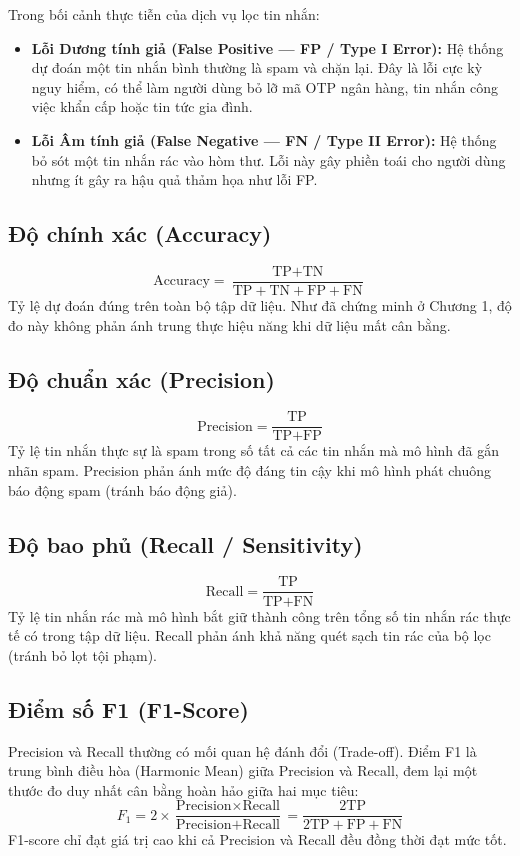 Trong bối cảnh thực tiễn của dịch vụ lọc tin nhắn:
\begin{itemize}
    \item \textbf{Lỗi Dương tính giả (False Positive --- FP / Type I Error):} Hệ thống dự đoán một tin nhắn bình thường là spam và chặn lại. Đây là lỗi cực kỳ nguy hiểm, có thể làm người dùng bỏ lỡ mã OTP ngân hàng, tin nhắn công việc khẩn cấp hoặc tin tức gia đình.
    \item \textbf{Lỗi Âm tính giả (False Negative --- FN / Type II Error):} Hệ thống bỏ sót một tin nhắn rác vào hòm thư. Lỗi này gây phiền toái cho người dùng nhưng ít gây ra hậu quả thảm họa như lỗi FP.
\end{itemize}

\subsection{Độ chính xác (Accuracy)}
\begin{equation}
\text{Accuracy} = \frac{\text{TP} + \text{TN}}{\text{TP} + \text{TN} + \text{FP} + \text{FN}}
\end{equation}
Tỷ lệ dự đoán đúng trên toàn bộ tập dữ liệu. Như đã chứng minh ở Chương 1, độ đo này không phản ánh trung thực hiệu năng khi dữ liệu mất cân bằng.

\subsection{Độ chuẩn xác (Precision)}
\begin{equation}
\text{Precision} = \frac{\text{TP}}{\text{TP} + \text{FP}}
\end{equation}
Tỷ lệ tin nhắn thực sự là spam trong số tất cả các tin nhắn mà mô hình đã gắn nhãn spam. Precision phản ánh mức độ đáng tin cậy khi mô hình phát chuông báo động spam (tránh báo động giả).

\subsection{Độ bao phủ (Recall / Sensitivity)}
\begin{equation}
\text{Recall} = \frac{\text{TP}}{\text{TP} + \text{FN}}
\end{equation}
Tỷ lệ tin nhắn rác mà mô hình bắt giữ thành công trên tổng số tin nhắn rác thực tế có trong tập dữ liệu. Recall phản ánh khả năng quét sạch tin rác của bộ lọc (tránh bỏ lọt tội phạm).

\subsection{Điểm số F1 (F1-Score)}
Precision và Recall thường có mối quan hệ đánh đổi (Trade-off). Điểm F1 là trung bình điều hòa (Harmonic Mean) giữa Precision và Recall, đem lại một thước đo duy nhất cân bằng hoàn hảo giữa hai mục tiêu:
\begin{equation}
F_1 = 2 \times \frac{\text{Precision} \times \text{Recall}}{\text{Precision} + \text{Recall}} = \frac{2\text{TP}}{2\text{TP} + \text{FP} + \text{FN}}
\end{equation}
F1-score chỉ đạt giá trị cao khi cả Precision và Recall đều đồng thời đạt mức tốt.

